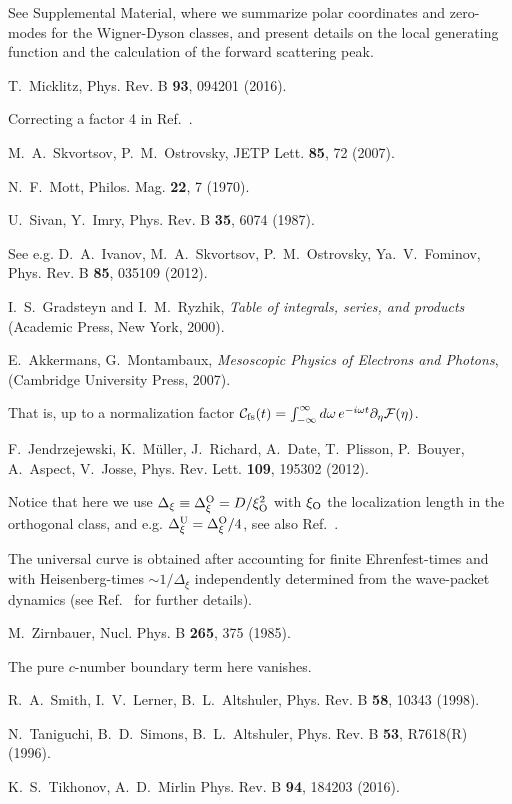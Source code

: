 \documentclass[twocolumn,showpacs,aps,prl]{revtex4}
\begin{document}
\begin{thebibliography}{99}
See Supplemental Material, where we summarize polar coordinates  
and zero-modes for the Wigner-Dyson classes, and 
 present details on the local generating function and the calculation of the forward scattering peak. 


T.~Micklitz, Phys. Rev. B {\bf 93},  094201 (2016).

Correcting a factor 4 in Ref.~.

M.~A.~Skvortsov, P.~M.~Ostrovsky, JETP Lett. {\bf 85}, 72 (2007).

N.~F.~Mott, Philos. Mag. {\bf 22}, 7 (1970).

U.~Sivan, Y.~Imry, Phys. Rev. B {\bf 35}, 6074 (1987).

See e.g.  
D.~A.~Ivanov, M.~A.~Skvortsov, P.~M.~Ostrovsky, Ya.~V.~Fominov, Phys. Rev. B {\bf 85}, 035109 (2012).

 I.~S.~Gradsteyn and  I.~M.~Ryzhik, {\it Table of integrals, 
series, and products} (Academic Press, New York, 2000).

E.~Akkermans, G.~Montambaux, {\it Mesoscopic Physics of Electrons and Photons}, (Cambridge University Press, 2007).

That is,  up to a normalization factor
${\cal C}_{\rm fs}(t)= \int_{-\infty}^\infty d\omega\, e^{-i\omega t}
\partial_\eta {\cal F}(\eta)$.

F.~Jendrzejewski, K.~M\"uller, J.~Richard, A.~Date, T.~Plisson, P.~Bouyer, A.~Aspect, 
V.~Josse, Phys. Rev. Lett. {\bf 109}, 195302 (2012).

Notice that here we use $\Delta_\xi\equiv\Delta^{\rm O}_\xi=D/\xi_{\rm O}^2$ 
with $\xi_{\rm O}$ the localization length in the orthogonal class, 
and e.g. $\Delta^{\rm U}_\xi=\Delta^{\rm O}_\xi/4$, see also Ref.~.

The universal curve is obtained after  
accounting for finite Ehrenfest-times and with Heisenberg-times $\sim1/\Delta_\xi$ 
independently 
determined from the wave-packet dynamics (see Ref.~ for further details). 


M.~Zirnbauer, Nucl. Phys. B {\bf 265}, 375 (1985).

The pure $c$-number boundary term here vanishes.

R.~A.~Smith, I.~V.~Lerner, B.~L.~Altshuler, Phys. Rev. B {\bf 58}, 10343 (1998).

N.~Taniguchi, B.~D.~Simons, B.~L.~Altshuler, Phys. Rev. B {\bf 53}, R7618(R) (1996).

K.~S.~Tikhonov, A.~D.~Mirlin Phys. Rev. B {\bf 94}, 184203 (2016).



\end{thebibliography}
\end{document}

